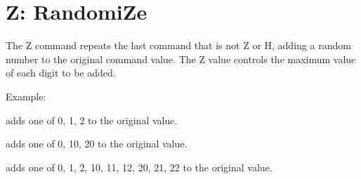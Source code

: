\section{Z: RandomiZe}

The Z command repeats the last command that is not Z or H, adding a random number to the original command value. The Z value controls the maximum value of each digit to be added.

\begin{description}
\item Example:
\item[Z02] adds one of 0, 1, 2 to the original value.
\item[Z20] adds one of 0, 10, 20 to the original value.
\item[Z22] adds one of 0, 1, 2, 10, 11, 12, 20, 21, 22 to the original value.
\end{description}
